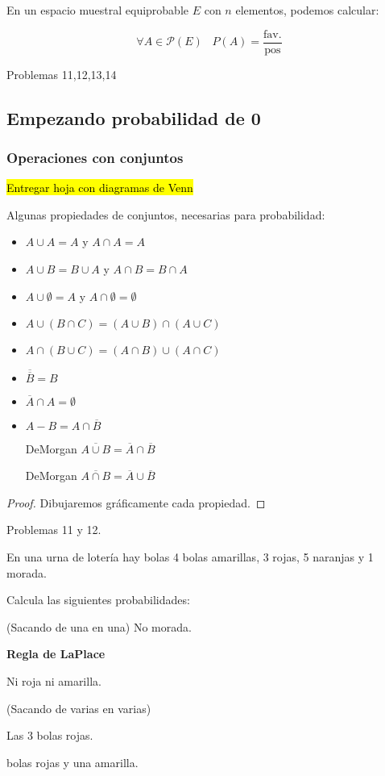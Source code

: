 \begin{prop}
En un espacio muestral equiprobable $E$ con $n$ elementos, podemos calcular:

\[\forall A\in \mathcal{P}(E)\;\;\; P(A) = \frac{\text{fav.}}{\text{pos}}\]
\end{prop}

Problemas 11,12,13,14


\subsection{Empezando probabilidad de 0}

\subsubsection{Operaciones con conjuntos}

\hl{Entregar hoja con diagramas de Venn}

\begin{prop}
Algunas propiedades de conjuntos, necesarias para probabilidad:

	\begin{itemize}
		\item $A\cup A=A$ y $A\cap A = A$
		\item $A\cup B=B\cup A$ y $A\cap B = B\cap A$
		\item $A\cup \emptyset=A$ y $A\cap \emptyset = \emptyset$
		\item $A\cup (B\cap C) = (A\cup B)\cap (A\cup C)$
		\item $A\cap (B\cup C) = (A\cap B)\cup (A\cap C)$
		\item $\overline{\overline{B}} = B$
		\item $\overline{A}\cap A = \emptyset$
		\item $A- B = A\cap \overline{B}$
		\item[DeMorgan] $\overline{A\cup B} = \overline{A}\cap\overline{B}$
		\item[DeMorgan] $\overline{A\cap B} = \overline{A}\cup\overline{B}$
	\end{itemize}
\end{prop}
\begin{proof}
Dibujaremos gráficamente cada propiedad.
\end{proof}



Problemas 11 y 12.

\begin{problem}[2]
En una urna de lotería hay bolas 4 bolas amarillas, 3 rojas, 5 naranjas y 1 morada.

Calcula las siguientes probabilidades:

(Sacando de una en una)
\ppart No morada.

\textbf{Regla de LaPlace}

\ppart Ni roja ni amarilla.

(Sacando de varias en varias)

\ppart Las 3 bolas rojas.

 bolas rojas y una amarilla.

\solution
\end{problem}

